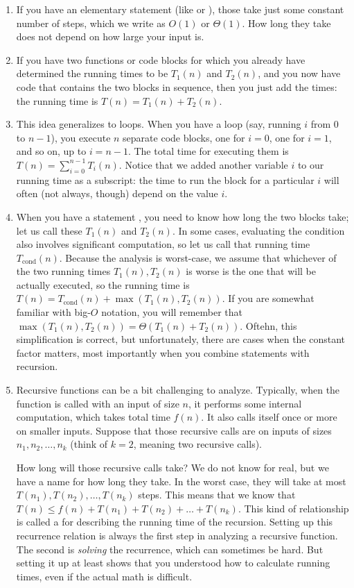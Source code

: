 \begin{enumerate}
\item If you have an elementary statement (like  or
  ), those take just some
  constant number of steps, which we write as $O(1)$ or $\Theta(1)$.
  How long they take does not depend on how large your input is.
\item If you have two functions or code blocks for which you already
  have determined the running times to be $T_1(n)$ and $T_2(n)$, and
  you now have code that contains the two blocks in sequence, then you
  just add the times: the running time is $T(n) = T_1(n)+T_2(n)$.
\item This idea generalizes to loops. When you have a loop (say,
  running $i$ from 0 to $n-1$), you execute $n$ separate code blocks,
  one for $i=0$, one for $i=1$, and so on, up to $i=n-1$.
  The total time for executing them is $T(n) = \sum_{i=0}^{n-1} T_i(n)$.
  Notice that we added another variable $i$ to our running time as a
  subscript: the time to run the block for a particular $i$ will often
  (not always, though) depend on the value $i$.
\item When you have a statement
  , you need to know
  how long the two blocks take; let us call these $T_1(n)$ and $T_2(n)$.
  In some cases, evaluating the condition also involves significant
  computation, so let us call that running time $T_{\text{cond}}(n)$.
  Because the analysis is worst-case, we assume that whichever of the
  two running times $T_1(n), T_2(n)$ is worse is the one that will be
  actually executed, so the running time is
  $T(n) = T_{\text{cond}}(n) + \max(T_1(n), T_2(n))$.
  If you are somewhat familiar with big-$O$ notation,
  you will remember that $\max(T_1(n), T_2(n)) = \Theta(T_1(n)+T_2(n))$.
  Oftehn, this simplification is correct, but unfortunately,
  there are cases when the constant factor matters, most importantly
  when you combine  statements with recursion.
\item Recursive functions can be a bit challenging to analyze.
  Typically, when the function is called with an input of size $n$,
  it performs some internal computation, which takes total time $f(n)$.
  It also calls itself once or more on smaller inputs.
  Suppose that those recursive calls are on inputs of sizes 
  $n_1, n_2, \ldots, n_k$ (think of $k=2$, meaning two recursive
  calls).

  How long will those recursive calls take?
  We do not know for real, but we have a name for how long they take.
  In the worst case, they will take
  at most $T(n_1), T(n_2), \ldots, T(n_k)$ steps.
  This means that we know that 
  $T(n) \leq f(n) + T(n_1) + T(n_2) + \ldots + T(n_k)$.
  This kind of relationship is called a  for describing the running time of the recursion.
  Setting up this recurrence relation is always the first step in
  analyzing a recursive function. The second is \emph{solving} the
  recurrence, which can sometimes be hard. But setting it up at least
  shows that you understood how to calculate running times, even if
  the actual math is difficult.
\end{enumerate}

